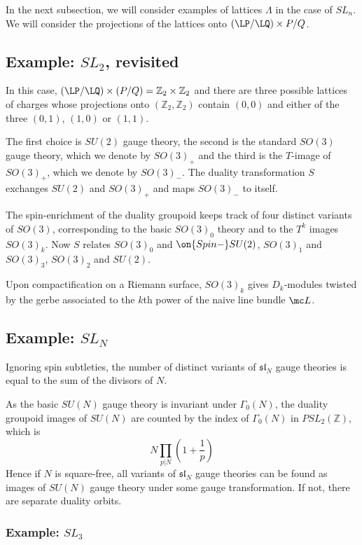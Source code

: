 \documentclass[11pt,reqno]{amsart}
\theoremstyle{plain}
\numberwithin{equation}{section}
\newcommand{\Z}{\mathbb{Z}}
\theoremstyle{definition}
\begin{document}
In the next subsection, we will consider examples of lattices
$\Lambda$ in the case of $SL_n$. We will consider the projections of
the lattices onto $(\LP/\LQ) \times P/Q$.

\subsection{Example: $SL_2$, revisited}

In this case, $(\LP/\LQ) \times (P/Q) = \Z_2 \times \Z_2$ and there
are three possible lattices of charges whose projections onto
$(\Z_2,\Z_2)$ contain $(0,0)$ and either of the three $(0,1)$, $(1,0)$
or $(1,1)$.

The first choice is $SU(2)$ gauge theory, the second is the standard
$SO(3)$ gauge theory, which we denote by $SO(3)_+$ and the third is
the $T$-image of $SO(3)_+$, which we denote by $SO(3)_-$. The duality
transformation $S$ exchanges $SU(2)$ and $SO(3)_+$ and maps $SO(3)_-$
to itself.

The spin-enrichment of the duality groupoid keeps track of four
distinct variants of $SO(3)$, corresponding to the basic $SO(3)_0$
theory and to the $T^k$ images $SO(3)_k$. Now $S$ relates $SO(3)_0$
and $\on{Spin-}SU(2)$, $SO(3)_1$ and $SO(3)_3$, $SO(3)_2$ and
$SU(2)$.

Upon compactification on a Riemann surface, $SO(3)_k$ gives
$D_k$-modules twisted by the gerbe associated to the $k$th power of
the naive line bundle ${\mc L}$.

\subsection{Example: $SL_N$}

Ignoring spin subtleties, the number of distinct variants of
$\mathfrak{sl}_N$ gauge theories is equal to the sum of the divisors
of $N$.

As the basic $SU(N)$ gauge theory is invariant under $\Gamma_0(N)$,
the duality groupoid images of $SU(N)$ are counted by the index of
$\Gamma_0(N)$ in $PSL_2(\Z)$, which is
\begin{equation}
N \prod_{p|N} \left(1+\frac{1}{p}\right)
\end{equation}
Hence if $N$ is square-free, all variants of $\mathfrak{sl}_N$ gauge
theories can be found as images of $SU(N)$ gauge theory under some
gauge transformation. If not, there are separate duality orbits.

\subsubsection{Example: $SL_3$}
\end{document}
